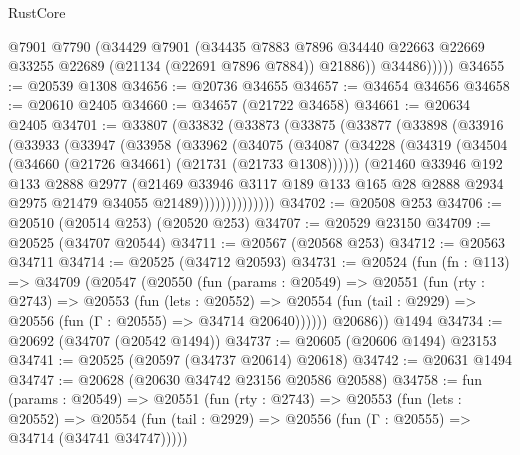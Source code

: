 \begin{lexlean}{RustCore}
\begin{coremodule}
              @7901
              @7790
              (@34429
                @7901
                (@34435
                  @7883
                  @7896
                  @34440
                  @22663
                  @22669
                  @33255
                  @22689
                  (@21134 (@22691 @7896 @7884))
                  @21886))
              @34486)))))
@34655 := @20539 @1308
@34656 := @20736 @34655
@34657 := @34654 @34656
@34658 := @20610 @2405
@34660 := @34657 (@21722 @34658)
@34661 := @20634 @2405
@34701 := @33807
    (@33832
      (@33873
        (@33875
          (@33877
            (@33898
              (@33916
                (@33933
                  (@33947
                    (@33958
                      (@33962
                        (@34075
                          (@34087
                            (@34228
                              (@34319 (@34504 (@34660 (@21726 @34661) (@21731 (@21733 @1308))))))
                            (@21460
                              @33946
                              @192
                              @133
                              @2888
                              @2977
                              (@21469
                                @33946
                                @3117
                                @189
                                @133
                                @165
                                @28
                                @2888
                                @2934
                                @2975
                                @21479
                                @34055
                                @21489))))))))))))))
@34702 := @20508 @253
@34706 := @20510 (@20514 @253) (@20520 @253)
@34707 := @20529 @23150
@34709 := @20525 (@34707 @20544)
@34711 := @20567 (@20568 @253)
@34712 := @20563 @34711
@34714 := @20525 (@34712 @20593)
@34731 := @20524
    (fun (fn : @113) =>
    @34709
      (@20547
        (@20550
          (fun (params : @20549) =>
          @20551
            (fun (rty : @2743) =>
            @20553
              (fun (lets : @20552) =>
              @20554 (fun (tail : @2929) => @20556 (fun (Γ : @20555) => @34714 @20640))))))
        @20686))
    @1494
@34734 := @20692 (@34707 (@20542 @1494))
@34737 := @20605 (@20606 @1494) @23153
@34741 := @20525 (@20597 (@34737 @20614) @20618)
@34742 := @20631 @1494
@34747 := @20628 (@20630 @34742 @23156 @20586 @20588)
@34758 := fun (params : @20549) =>
  @20551
    (fun (rty : @2743) =>
    @20553
      (fun (lets : @20552) =>
      @20554 (fun (tail : @2929) => @20556 (fun (Γ : @20555) => @34714 (@34741 @34747)))))

\end{coremodule}
\end{lexlean}
